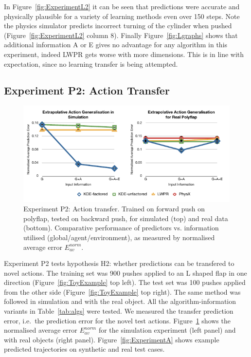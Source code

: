 In Figure~\ref{fig:ExperimentL2} it can be
seen that predictions were accurate and physically plausible for a
variety of learning methods even over 150 steps. Note the physics
simulator predicts incorrect turning of the cylinder when pushed
(Figure~\ref{fig:ExperimentL2} column 8). Finally Figure~\ref{fig:Lgraphs} shows that additional information A or E gives no advantage for any algorithm in this experiment, indeed LWPR gets worse with more dimensions. This is in line with expectation, since no learning transfer is being attempted.

\subsection{Experiment P2: Action Transfer}
\label{sec:Results.Action}

\begin{figure}[t]
\centerline{\includegraphics[width=\columnwidth]{graphs_jw/P2-graphs}}
\caption{Experiment P2: Action transfer. Trained on forward push on polyflap, tested on backward push, for simulated (top) and real data (bottom). Comparative performance of predictors vs. information utilised (global/agent/environment),
as measured by normalised average error ${E_{av}^{norm}}$.
}\label{fig:A_av_graphs}
\end{figure}

Experiment P2 tests hypothesis H2: whether predictions can be
transfered to novel actions.  The training set was 900 pushes applied to an L shaped flap in one direction (Figure~\ref{fig:ToyExample} top
left).  The test set was 100 pushes applied from the other side (Figure~\ref{fig:ToyExample} top right). The same method was followed in simulation and with the real object. All the algorithm-information variants in Table~\ref{tab:algs} were tested. We measured the transfer prediction error, i.e.\ the prediction error for the novel test actions. Figure~\ref{fig:A_av_graphs} %
shows the normalised average error $E_{av}^{norm}$ for the simulation experiment (left panel) and with real objects (right panel).
Figure~\ref{fig:ExperimentA} shows example predicted trajectories on
synthetic and real test cases.

